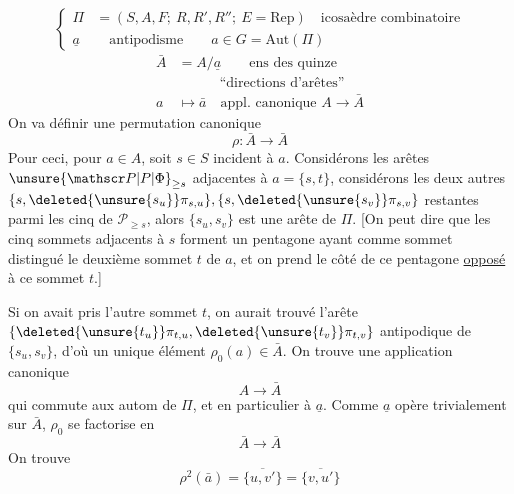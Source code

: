 \[
\left\{\begin{aligned}
\Pi&=(S,A,F;\ R,R',R'';\ E=\mathrm{Rep})\quad\text{icosaèdre combinatoire}\\
\underline a&\quad\text{antipodisme}\qquad a\in G=\mathrm{Aut}(\Pi)
\end{aligned}\right.
\]
\[
\begin{aligned}
\bar A&=A/\underline a\qquad\text{ens des quinze}\\
&\hspace{3em}\text{``directions d'arêtes''}\\
a&\longmapsto\bar a\quad\text{appl. canonique }A\longrightarrow\bar A
\end{aligned}
\]
On va définir une permutation canonique
\[
\rho:\bar A\longrightarrow\bar A
\]
Pour ceci, pour $a\in A$, soit $s\in S$ incident à $a$. Considérons les  arêtes   $\unsure{\mathscr P|P|\Phi}_{\geq s}$ adjacentes à $a=\{s,t\}$, considérons les deux autres $\{s,\deleted{\unsure{s_u}}\pi_{s,u}\},\{s,\deleted{\unsure{s_v}}\pi_{s,v}\}$ restantes parmi les cinq de $\mathscr P_{\geq s}$, alors $\{s_u,s_v\}$ est une arête de $\Pi$. [On peut dire que les cinq sommets adjacents à $s$ forment un pentagone ayant comme sommet distingué le deuxième sommet $t$ de $a$, et on prend le côté de ce pentagone \uline{opposé} à ce sommet $t$.]


Si on avait pris l'autre sommet $t$, on aurait trouvé l'arête $\{\deleted{\unsure{t_u}}\pi_{t,u},\deleted{\unsure{t_v}}\pi_{t,v}\}$ antipodique de $\{s_u,s_v\}$, d'où un unique élément $\rho_0(a)\in\bar A$. On trouve  une application canonique
\[
 A\longrightarrow\bar A
\]
qui commute aux autom de $\Pi$, et en particulier à $\underline a$. Comme $\underline a$ opère trivialement sur $\bar A$, \deleted{\unsure{$\exists$}} $\rho_0$ se factorise en
\[
\bar A\longrightarrow\bar A
\]
On trouve
\[
\rho^2(\bar a)=\overline{\{u,v'\}}=\overline{\{v,u'\}}
\]
